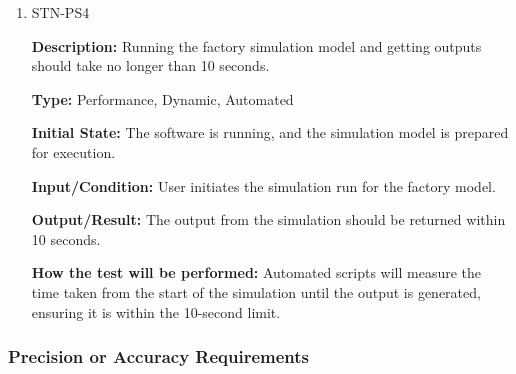 \documentclass[12pt, titlepage]{article}
\begin{document}
\begin{enumerate}
\textbf{Initial State:} The software is running and a previously saved schema is available.

\textbf{Input/Condition:} User initiates the restore operation for a schema.

\textbf{Output/Result:} The schema should be restored from the filesystem within 1 second.

\textbf{How the test will be performed:} Automated tests will measure the time taken to complete the restore operation, ensuring it is less than 1 second.

\item{STN-PS4\\}

\textbf{Description:} Running the factory simulation model and getting outputs should take no longer than 10 seconds.

\textbf{Type:} Performance, Dynamic, Automated

\textbf{Initial State:} The software is running, and the simulation model is prepared for execution.

\textbf{Input/Condition:} User initiates the simulation run for the factory model.

\textbf{Output/Result:} The output from the simulation should be returned within 10 seconds.

\textbf{How the test will be performed:} Automated scripts will measure the time taken from the start of the simulation until the output is generated, ensuring it is within the 10-second limit.

\end{enumerate}

\subsubsection{Precision or Accuracy Requirements}
\end{document}

